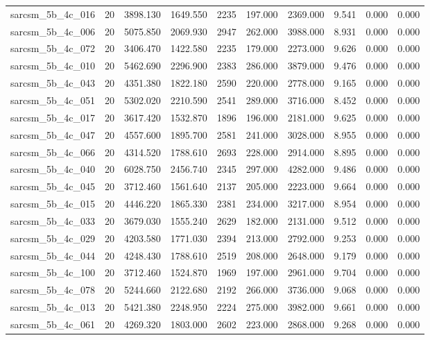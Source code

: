 \begin{tabular}{lrrrrrrrrr}
sarcsm\_5b\_4c\_016 & 20 & 3898.130 & 1649.550 & 2235 & 197.000 & 2369.000 & 9.541 & 0.000 & 0.000 \\
sarcsm\_5b\_4c\_006 & 20 & 5075.850 & 2069.930 & 2947 & 262.000 & 3988.000 & 8.931 & 0.000 & 0.000 \\
sarcsm\_5b\_4c\_072 & 20 & 3406.470 & 1422.580 & 2235 & 179.000 & 2273.000 & 9.626 & 0.000 & 0.000 \\
sarcsm\_5b\_4c\_010 & 20 & 5462.690 & 2296.900 & 2383 & 286.000 & 3879.000 & 9.476 & 0.000 & 0.000 \\
sarcsm\_5b\_4c\_043 & 20 & 4351.380 & 1822.180 & 2590 & 220.000 & 2778.000 & 9.165 & 0.000 & 0.000 \\
sarcsm\_5b\_4c\_051 & 20 & 5302.020 & 2210.590 & 2541 & 289.000 & 3716.000 & 8.452 & 0.000 & 0.000 \\
sarcsm\_5b\_4c\_017 & 20 & 3617.420 & 1532.870 & 1896 & 196.000 & 2181.000 & 9.625 & 0.000 & 0.000 \\
sarcsm\_5b\_4c\_047 & 20 & 4557.600 & 1895.700 & 2581 & 241.000 & 3028.000 & 8.955 & 0.000 & 0.000 \\
sarcsm\_5b\_4c\_066 & 20 & 4314.520 & 1788.610 & 2693 & 228.000 & 2914.000 & 8.895 & 0.000 & 0.000 \\
sarcsm\_5b\_4c\_040 & 20 & 6028.750 & 2456.740 & 2345 & 297.000 & 4282.000 & 9.486 & 0.000 & 0.000 \\
sarcsm\_5b\_4c\_045 & 20 & 3712.460 & 1561.640 & 2137 & 205.000 & 2223.000 & 9.664 & 0.000 & 0.000 \\
sarcsm\_5b\_4c\_015 & 20 & 4446.220 & 1865.330 & 2381 & 234.000 & 3217.000 & 8.954 & 0.000 & 0.000 \\
sarcsm\_5b\_4c\_033 & 20 & 3679.030 & 1555.240 & 2629 & 182.000 & 2131.000 & 9.512 & 0.000 & 0.000 \\
sarcsm\_5b\_4c\_029 & 20 & 4203.580 & 1771.030 & 2394 & 213.000 & 2792.000 & 9.253 & 0.000 & 0.000 \\
sarcsm\_5b\_4c\_044 & 20 & 4248.430 & 1788.610 & 2519 & 208.000 & 2648.000 & 9.179 & 0.000 & 0.000 \\
sarcsm\_5b\_4c\_100 & 20 & 3712.460 & 1524.870 & 1969 & 197.000 & 2961.000 & 9.704 & 0.000 & 0.000 \\
sarcsm\_5b\_4c\_078 & 20 & 5244.660 & 2122.680 & 2192 & 266.000 & 3736.000 & 9.068 & 0.000 & 0.000 \\
sarcsm\_5b\_4c\_013 & 20 & 5421.380 & 2248.950 & 2224 & 275.000 & 3982.000 & 9.661 & 0.000 & 0.000 \\
sarcsm\_5b\_4c\_061 & 20 & 4269.320 & 1803.000 & 2602 & 223.000 & 2868.000 & 9.268 & 0.000 & 0.000 \\

\end{tabular}
